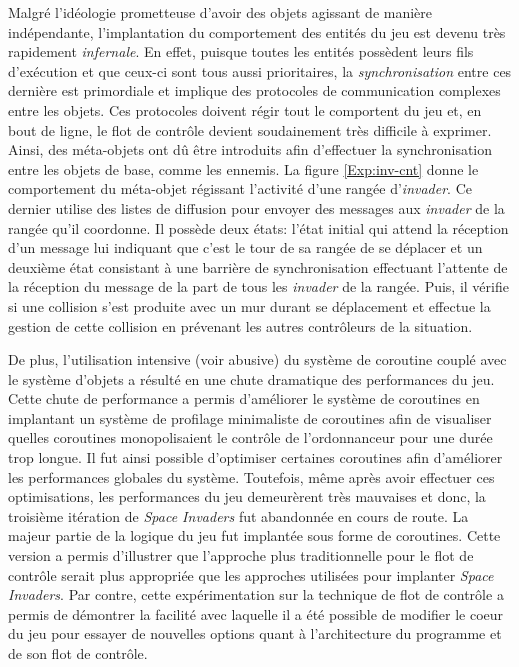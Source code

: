 \documentclass[12pt,twoside,letterpaper,francais]{book}
\newcommand{\scheme}[1]{\selectlanguage{english}{\tt #1}\selectlanguage{french}}
\begin{document}
Malgré l'idéologie prometteuse d'avoir des objets agissant de manière
indépendante, l'implantation du comportement des entités du jeu est
devenu très rapidement \emph{infernale}. En effet, puisque toutes les
entités possèdent leurs fils d'exécution et que ceux-ci sont tous
aussi prioritaires, la \emph{synchronisation} entre ces dernière est
primordiale et implique des protocoles de communication complexes
entre les objets. Ces protocoles doivent régir tout le comportent du
jeu et, en bout de ligne, le flot de contrôle devient soudainement
très difficile à exprimer. Ainsi, des méta-objets ont dû être
introduits afin d'effectuer la synchronisation entre les objets de
base, comme les ennemis. La figure \ref{Exp:inv-cnt} donne le
comportement du méta-objet régissant l'activité d'une rangée
d'\textit{invader}. Ce dernier utilise des listes de diffusion pour
envoyer des messages aux \textit{invader} de la rangée qu'il
coordonne. Il possède deux états: l'état initial qui attend la
réception d'un message lui indiquant que c'est le tour de sa rangée de
se déplacer et un deuxième état consistant à une barrière de
synchronisation effectuant l'attente de la réception du message
\scheme{moved} de la part de tous les \textit{invader} de la
rangée. Puis, il vérifie si une collision s'est produite avec un mur
durant se déplacement et effectue la gestion de cette collision en
prévenant les autres contrôleurs de la situation.

De plus, l'utilisation intensive (voir abusive) du système de
coroutine couplé avec le système d'objets a résulté en une chute
dramatique des performances du jeu. Cette chute de performance a
permis d'améliorer le système de coroutines en implantant un système
de profilage minimaliste de coroutines afin de visualiser quelles
coroutines monopolisaient le contrôle de l'ordonnanceur pour une durée
trop longue. Il fut ainsi possible d'optimiser certaines coroutines
afin d'améliorer les performances globales du système. Toutefois, même
après avoir effectuer ces optimisations, les performances du jeu
demeurèrent très mauvaises et donc, la troisième itération de \textit{Space Invaders} fut
abandonnée en cours de route. La majeur partie de la logique du jeu
fut implantée sous forme de coroutines. Cette version a permis
d'illustrer que l'approche plus traditionnelle pour le flot de
contrôle serait plus appropriée que les approches utilisées pour
implanter \textit{Space Invaders}. Par contre, cette expérimentation sur la technique de
flot de contrôle a permis de démontrer la facilité avec laquelle il a
été possible de modifier le coeur du jeu pour essayer de nouvelles
options quant à l'architecture du programme et de son flot de
contrôle.\\
\end{document}
